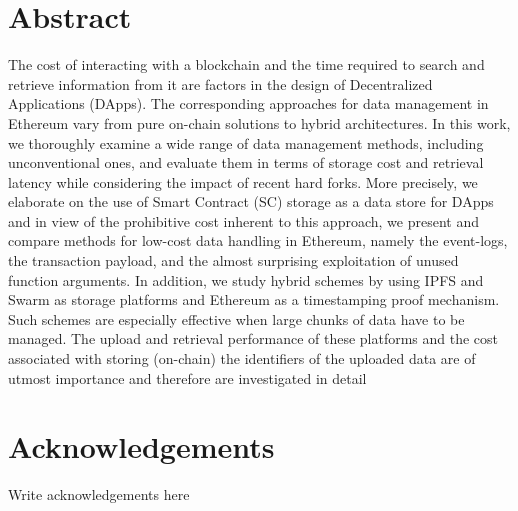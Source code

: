 


 



\chapter*{Abstract}
 
 The cost of interacting with a blockchain and the time required to search and retrieve information from it are  factors in the design of Decentralized Applications (DApps). The corresponding approaches for data management in Ethereum vary from pure on-chain solutions to hybrid architectures. In this work, we thoroughly examine a wide range of data management methods, including unconventional ones, and evaluate them in terms of storage cost and retrieval latency while considering the impact of recent hard forks. More precisely, we elaborate on the use of Smart Contract (SC) storage as a data store for DApps and in view of the prohibitive cost inherent to this approach, we present and compare methods for low-cost data handling in Ethereum, namely the event-logs, the transaction payload, and the almost surprising exploitation of unused function arguments. In addition, we study hybrid schemes by using IPFS and Swarm as storage platforms and Ethereum as a timestamping proof mechanism. Such schemes are especially effective when large chunks of data have to be managed. The upload and retrieval performance of these platforms and the cost associated with storing (on-chain) the identifiers of the uploaded data are of utmost importance and therefore are investigated in detail 
 
 \cleardoublepage



\chapter*{Acknowledgements}

Write acknowledgements here

 \cleardoublepage


